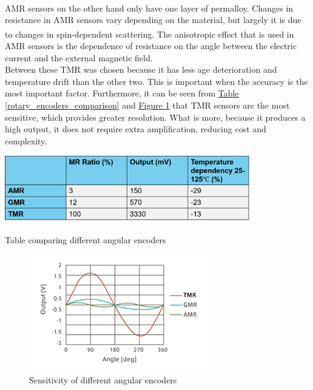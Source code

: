 \documentclass[11pt]{article}		%
\newlength{\imageheight}	 %
\newcommand{\supercite}[1]{\textsuperscript{\cite{#1}}}		%
\newcommand{\figref}[1]{\hyperref[#1]{Figure \ref*{#1}}}    %
\newcommand{\tableref}[1]{\hyperref[#1]{Table \ref*{#1}}}     %
\begin{document}
            \\
            AMR sensors on the other hand only have one layer of permalloy. 
            Changes in resistance in AMR sensors vary depending on the material, but largely it is due to changes in spin-dependent scattering.\supercite{explanation_magntoresistance2}
            The anisotropic effect that is used in AMR sensors is the dependence of resistance on the angle between the electric current and the external magnetic field.
            \\
            Between these TMR was chosen because it has less age deterioration and temperature drift than the other two.
            This is important when the accuracy is the most important factor. 
            Furthermore, it can be seen from \tableref{rotary_encoders_comparison} and \figref{rotary_encoders_graph} that TMR sensors are the most sensitive, which provides greater resolution. What is more, because it produces a high output, it does not require extra amplification, reducing cost and complexity. 
            
            \begin{table}[h]
					\centering
						\includegraphics[width=0.8\textwidth] {AMR_comparison table_formatted}
						\caption{Table comparing different angular encoders}
						\label{rotary_encoders_comparison}
				\end{table}
				
			    \begin{figure}[h]
					\centering
					\includegraphics[height=\imageheight] {Graph_of_different_rotary_encoders}
					\caption{Sensitivity of different angular encoders \cite{TMR_graph}}
					\label{rotary_encoders_graph}
				\end{figure}
            
\end{document}
